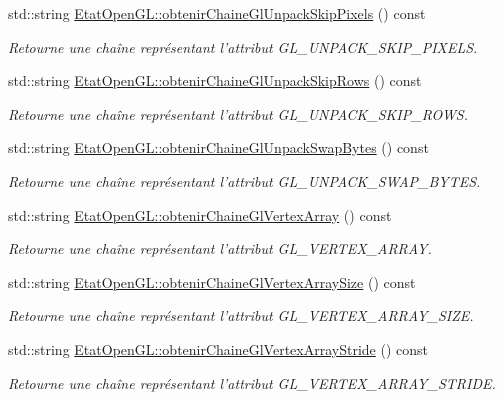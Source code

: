 \begin{DoxyCompactItemize}
std\-::string \hyperlink{group__utilitaire_gaa0abd9dc2b1158d657d9553424732bb8}{Etat\-Open\-G\-L\-::obtenir\-Chaine\-Gl\-Unpack\-Skip\-Pixels} () const 
\begin{DoxyCompactList}\small\item\em Retourne une chaîne représentant l'attribut G\-L\-\_\-\-U\-N\-P\-A\-C\-K\-\_\-\-S\-K\-I\-P\-\_\-\-P\-I\-X\-E\-L\-S. \end{DoxyCompactList}\item 
std\-::string \hyperlink{group__utilitaire_gaa4065b05943d7e949fd785f85dd3cdc2}{Etat\-Open\-G\-L\-::obtenir\-Chaine\-Gl\-Unpack\-Skip\-Rows} () const 
\begin{DoxyCompactList}\small\item\em Retourne une chaîne représentant l'attribut G\-L\-\_\-\-U\-N\-P\-A\-C\-K\-\_\-\-S\-K\-I\-P\-\_\-\-R\-O\-W\-S. \end{DoxyCompactList}\item 
std\-::string \hyperlink{group__utilitaire_gaa9b797c3176f4a4cb2094550ebaab4d9}{Etat\-Open\-G\-L\-::obtenir\-Chaine\-Gl\-Unpack\-Swap\-Bytes} () const 
\begin{DoxyCompactList}\small\item\em Retourne une chaîne représentant l'attribut G\-L\-\_\-\-U\-N\-P\-A\-C\-K\-\_\-\-S\-W\-A\-P\-\_\-\-B\-Y\-T\-E\-S. \end{DoxyCompactList}\item 
std\-::string \hyperlink{group__utilitaire_gaaa758212d7a3f274415edbc9e2532289}{Etat\-Open\-G\-L\-::obtenir\-Chaine\-Gl\-Vertex\-Array} () const 
\begin{DoxyCompactList}\small\item\em Retourne une chaîne représentant l'attribut G\-L\-\_\-\-V\-E\-R\-T\-E\-X\-\_\-\-A\-R\-R\-A\-Y. \end{DoxyCompactList}\item 
std\-::string \hyperlink{group__utilitaire_ga5475c8155f182e7c018cca2f6124f746}{Etat\-Open\-G\-L\-::obtenir\-Chaine\-Gl\-Vertex\-Array\-Size} () const 
\begin{DoxyCompactList}\small\item\em Retourne une chaîne représentant l'attribut G\-L\-\_\-\-V\-E\-R\-T\-E\-X\-\_\-\-A\-R\-R\-A\-Y\-\_\-\-S\-I\-Z\-E. \end{DoxyCompactList}\item 
std\-::string \hyperlink{group__utilitaire_ga7830e4ba0be698e54d824a5c6a430f5d}{Etat\-Open\-G\-L\-::obtenir\-Chaine\-Gl\-Vertex\-Array\-Stride} () const 
\begin{DoxyCompactList}\small\item\em Retourne une chaîne représentant l'attribut G\-L\-\_\-\-V\-E\-R\-T\-E\-X\-\_\-\-A\-R\-R\-A\-Y\-\_\-\-S\-T\-R\-I\-D\-E. \end{DoxyCompactList}\item 

\end{DoxyCompactItemize}
